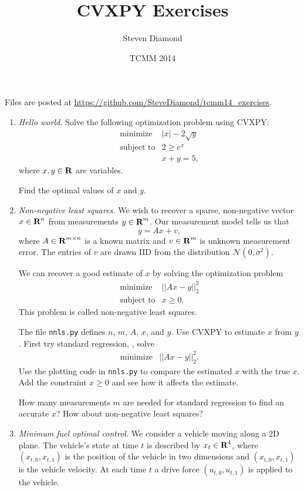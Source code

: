 \documentclass[12pt]{article}
\title{CVXPY Exercises}
\author{Steven Diamond}
\date{TCMM 2014}
\begin{document}
\maketitle

Files are posted at \url{https://github.com/SteveDiamond/tcmm14_exercises}.

\begin{enumerate}
\item\emph{Hello world.}
Solve the following optimization problem using CVXPY:
\[
\begin{array}{ll} \mbox{minimize} & |x| - 2\sqrt{y}\\
\mbox{subject to} & 2 \geq e^x \\
& x + y = 5,
\end{array}
\]
where $x,y \in {\mbox{\bf R}}$ are variables.

Find the optimal values of $x$ and $y$.

\item\emph{Non-negative least squares.}
We wish to recover a sparse, non-negative vector $x \in {\mbox{\bf R}}^n$ from measurements $y \in {\mbox{\bf R}}^m$. Our measurement model tells us that
$$
y = Ax + v,
$$
where $A \in {\mbox{\bf R}}^{m \times n}$ is a known matrix and $v \in {\mbox{\bf R}}^m$ is unknown measurement error. The entries of $v$ are drawn IID from the distribution $\mathcal{N}(0, \sigma^2)$.

We can recover a good estimate of $x$ by solving the optimization problem
\[
\begin{array}{ll} \mbox{minimize} & ||Ax - y||^2_2\\
\mbox{subject to} & x \geq 0.
\end{array}
\]
This problem is called non-negative least squares.

The file \verb+nnls.py+ defines $n$, $m$, $A$, $x$, and $y$. Use CVXPY to estimate $x$ from $y$. First try standard regression, \ie, solve
\[
\begin{array}{ll} \mbox{minimize} & ||Ax - y||^2_2.
\end{array}
\]
Use the plotting code in \verb+nnls.py+ to compare the estimated $x$ with the true $x$. Add the constraint $x \geq 0$ and see how it affects the estimate.

How many measurements $m$ are needed for standard regression to find an accurate $x$? How about non-negative least squares?

\item \emph{Minimum fuel optimal control.}
We consider a vehicle moving along a 2D plane. The vehicle's state at time $t$ is described by $x_t \in {\mbox{\bf R}}^4$, where $(x_{t,0}, x_{t,1})$ is the position of the vehicle in two dimensions and $(x_{t,0}, x_{t,1})$ is the vehicle velocity. At each time $t$ a drive force $(u_{t,0}, u_{t,1})$ is applied to the vehicle.


\end{enumerate}
\end{document}
